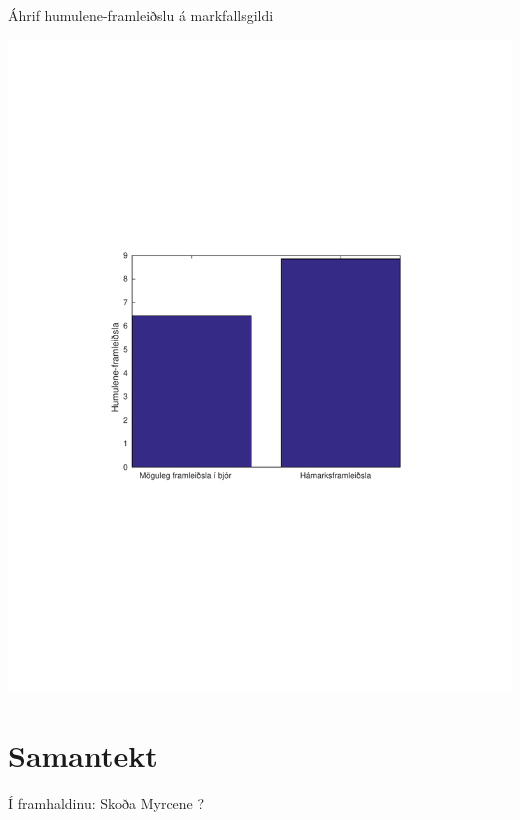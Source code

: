 \documentclass[11pt]{article}
\makeatletter
\newenvironment{figureonecolumn}{\begin{minipage}{\linewidth}\begin{center}\def\@captype{figure}}{\end{center}\end{minipage}}
\makeatother
\begin{document}
\begin{multicols}{2}
\begin{figureonecolumn}
\caption{Áhrif humulene-framleiðslu á markfallsgildi}
\includegraphics[width=\linewidth]{Pics/BrewingRobustnessAnalysis}
\end{figureonecolumn}

\section{Samantekt}


Í framhaldinu: Skoða Myrcene \cite[KEGG: C06074]{Kanehisa01012000}?




\end{multicols}
\end{document}
